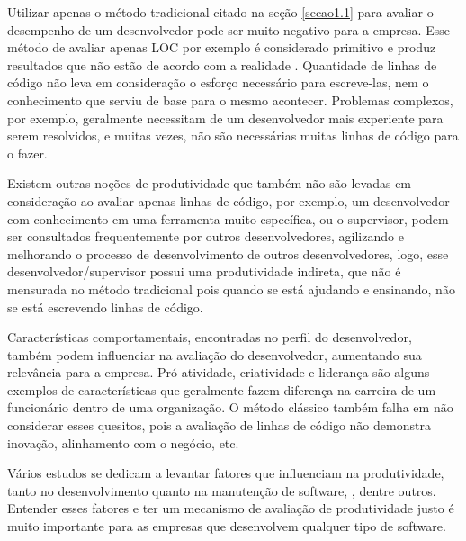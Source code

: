 Utilizar apenas o método tradicional citado na seção \ref{secao1.1} para avaliar o desempenho de um desenvolvedor pode ser muito negativo para a empresa. Esse método de avaliar apenas LOC por exemplo é considerado primitivo e produz resultados que não estão de acordo com a realidade \cite{Symons2010}. Quantidade de linhas de código não leva em consideração o esforço necessário para escreve-las, nem o conhecimento que serviu de base para o mesmo acontecer. Problemas complexos, por exemplo, geralmente necessitam de um desenvolvedor mais experiente para serem resolvidos, e muitas vezes, não são necessárias muitas linhas de código para o fazer.

Existem outras noções de produtividade que também não são levadas em consideração ao avaliar apenas linhas de código, por exemplo, um desenvolvedor com conhecimento em uma ferramenta muito específica, ou o supervisor, podem ser consultados frequentemente por outros desenvolvedores, agilizando e melhorando o processo de desenvolvimento de outros desenvolvedores, logo, esse desenvolvedor/supervisor possui uma produtividade indireta, que não é mensurada no método tradicional pois quando se está ajudando e ensinando, não se está escrevendo linhas de código.

Características comportamentais, encontradas no perfil do desenvolvedor, também podem influenciar na avaliação do desenvolvedor, aumentando sua relevância para a empresa. Pró-atividade, criatividade e liderança são alguns exemplos de características que geralmente fazem diferença na carreira de um funcionário dentro de uma organização. O método clássico também falha em não considerar esses quesitos, pois a avaliação de linhas de código não demonstra inovação, alinhamento com o negócio, etc.

Vários estudos se dedicam a levantar fatores que influenciam na produtividade, tanto no desenvolvimento quanto na manutenção de software, \cite{deBarrosSampaio2010, Wagner2008, Calow1991, Vosburgh1984}, dentre outros. Entender esses fatores e ter um mecanismo de avaliação de produtividade justo é muito importante para as empresas que desenvolvem qualquer tipo de software.

